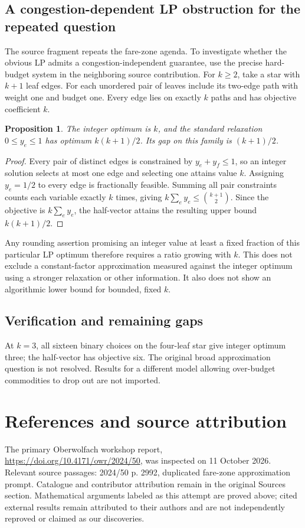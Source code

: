 \documentclass[11pt]{article}
\newtheorem{proposition}{Proposition}
\begin{document}
\subsection{A congestion-dependent LP obstruction for the repeated question}
The source fragment repeats the fare-zone agenda. To investigate whether the obvious LP admits a congestion-independent guarantee, use the precise hard-budget system in the neighboring source contribution. For $k\ge2$, take a star with $k+1$ leaf edges. For each unordered pair of leaves include its two-edge path with weight one and budget one. Every edge lies on exactly $k$ paths and has objective coefficient $k$.
\begin{proposition}
The integer optimum is $k$, and the standard relaxation $0\le y_e\le1$ has optimum $k(k+1)/2$. Its gap on this family is $(k+1)/2$.
\end{proposition}
\begin{proof}
Every pair of distinct edges is constrained by $y_e+y_f\le1$, so an integer solution selects at most one edge and selecting one attains value $k$. Assigning $y_e=1/2$ to every edge is fractionally feasible. Summing all pair constraints counts each variable exactly $k$ times, giving $k\sum_e y_e\le\binom{k+1}{2}$. Since the objective is $k\sum_e y_e$, the half-vector attains the resulting upper bound $k(k+1)/2$.
\end{proof}
Any rounding assertion promising an integer value at least a fixed fraction of this particular LP optimum therefore requires a ratio growing with $k$. This does not exclude a constant-factor approximation measured against the integer optimum using a stronger relaxation or other information. It also does not show an algorithmic lower bound for bounded, fixed $k$.
\subsection{Verification and remaining gaps}
At $k=3$, all sixteen binary choices on the four-leaf star give integer optimum three; the half-vector has objective six. The original broad approximation question is not resolved. Results for a different model allowing over-budget commodities to drop out are not imported.

\section{References and source attribution}
The primary Oberwolfach workshop report, \url{https://doi.org/10.4171/owr/2024/50}, was inspected on 11 October 2026. Relevant source passages: 2024/50 p. 2992, duplicated fare-zone approximation prompt. Catalogue and contributor attribution remain in the original Sources section. Mathematical arguments labeled as this attempt are proved above; cited external results remain attributed to their authors and are not independently reproved or claimed as our discoveries.
\end{document}
